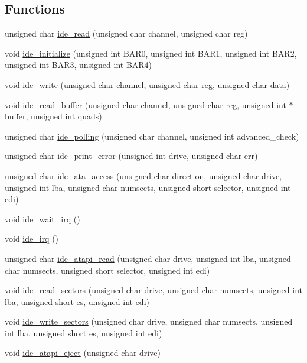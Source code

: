 \subsection*{Functions}
\begin{DoxyCompactItemize}
\item 
unsigned char \hyperlink{a00005_aef734da4bdc0c1d014528fd2f66e0686_aef734da4bdc0c1d014528fd2f66e0686}{ide\+\_\+read} (unsigned char channel, unsigned char reg)
\item 
void \hyperlink{a00005_ab5397c8432be802172da8f04c8840ca3_ab5397c8432be802172da8f04c8840ca3}{ide\+\_\+initialize} (unsigned int B\+A\+R0, unsigned int B\+A\+R1, unsigned int B\+A\+R2, unsigned int B\+A\+R3, unsigned int B\+A\+R4)
\item 
void \hyperlink{a00005_afdb22c37a32d86fcb64e55b3edab4790_afdb22c37a32d86fcb64e55b3edab4790}{ide\+\_\+write} (unsigned char channel, unsigned char reg, unsigned char data)
\item 
void \hyperlink{a00005_a905d9e8d026f3b6f298cbf41c0bde7e2_a905d9e8d026f3b6f298cbf41c0bde7e2}{ide\+\_\+read\+\_\+buffer} (unsigned char channel, unsigned char reg, unsigned int $\ast$buffer, unsigned int quads)
\item 
unsigned char \hyperlink{a00005_a03e85b94d6fbfb957e1b88c3dd064eca_a03e85b94d6fbfb957e1b88c3dd064eca}{ide\+\_\+polling} (unsigned char channel, unsigned int advanced\+\_\+check)
\item 
unsigned char \hyperlink{a00005_af7757307613c29c9bcbf0f8f5b2feee5_af7757307613c29c9bcbf0f8f5b2feee5}{ide\+\_\+print\+\_\+error} (unsigned int drive, unsigned char err)
\item 
unsigned char \hyperlink{a00005_a4da0883393a98b937fdc3015a0a3f265_a4da0883393a98b937fdc3015a0a3f265}{ide\+\_\+ata\+\_\+access} (unsigned char direction, unsigned char drive, unsigned int lba, unsigned char numsects, unsigned short selector, unsigned int edi)
\item 
void \hyperlink{a00005_a31655fcec0cc8f9f8792b98cd4441fdf_a31655fcec0cc8f9f8792b98cd4441fdf}{ide\+\_\+wait\+\_\+irq} ()
\item 
void \hyperlink{a00005_ad7ea572af581cc0623a2fb74a579ca83_ad7ea572af581cc0623a2fb74a579ca83}{ide\+\_\+irq} ()
\item 
unsigned char \hyperlink{a00005_a1652da42785708fa6ea21ce4aef8c628_a1652da42785708fa6ea21ce4aef8c628}{ide\+\_\+atapi\+\_\+read} (unsigned char drive, unsigned int lba, unsigned char numsects, unsigned short selector, unsigned int edi)
\item 
void \hyperlink{a00005_a9dd84843412753d236e17a15277c5b98_a9dd84843412753d236e17a15277c5b98}{ide\+\_\+read\+\_\+sectors} (unsigned char drive, unsigned char numsects, unsigned int lba, unsigned short es, unsigned int edi)
\item 
void \hyperlink{a00005_a8632fb3a8cd41b7d60ee56942afbde03_a8632fb3a8cd41b7d60ee56942afbde03}{ide\+\_\+write\+\_\+sectors} (unsigned char drive, unsigned char numsects, unsigned int lba, unsigned short es, unsigned int edi)
\item 
void \hyperlink{a00005_a92d054539c112a72e080e35a3341b0b9_a92d054539c112a72e080e35a3341b0b9}{ide\+\_\+atapi\+\_\+eject} (unsigned char drive)
\end{DoxyCompactItemize}
